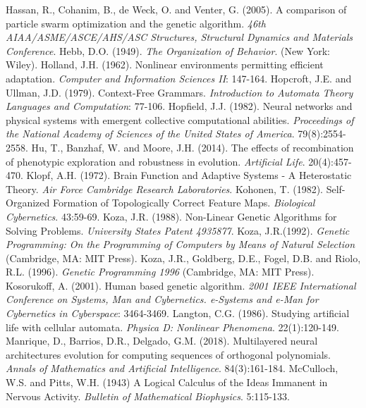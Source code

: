 \documentclass[spanish,a4paper,12pt,twoside]{report}
\begin{document}
\begin{thebibliography}{00}
   Hassan, R., Cohanim, B., de Weck, O. and Venter, G. (2005). A comparison of particle swarm optimization and the genetic algorithm. \emph{46th AIAA/ASME/ASCE/AHS/ASC Structures, Structural Dynamics and Materials Conference}.
   Hebb, D.O. (1949). \emph{The Organization of Behavior}. (New York: Wiley).
   Holland, J.H. (1962). Nonlinear environments permitting efficient adaptation. \emph{Computer and Information Sciences II}: 147-164.
   Hopcroft, J.E. and Ullman, J.D. (1979). Context-Free Grammars. \emph{Introduction to Automata Theory Languages and Computation}: 77-106.
   Hopfield, J.J. (1982). Neural networks and physical systems with emergent collective computational abilities. \emph{Proceedings of the National Academy of Sciences of the United States of America}. 79(8):2554-2558.
   Hu, T., Banzhaf, W. and Moore, J.H. (2014). The effects of recombination of phenotypic exploration and robustness in evolution. \emph{Artificial Life}. 20(4):457-470.
   Klopf, A.H. (1972). Brain Function and Adaptive Systems - A Heterostatic Theory. \emph{Air Force Cambridge Research Laboratories}.
   Kohonen, T. (1982). Self-Organized Formation of Topologically Correct Feature Maps. \emph{Biological Cybernetics}. 43:59-69.
   Koza, J.R. (1988). Non-Linear Genetic Algorithms for Solving Problems. \emph{University States Patent 4935877}.
   Koza, J.R.(1992). \emph{Genetic Programming: On the Programming of Computers by Means of Natural Selection}  (Cambridge, MA: MIT Press).
   Koza, J.R., Goldberg, D.E., Fogel, D.B. and Riolo, R.L. (1996). \emph{Genetic Programming 1996} (Cambridge, MA: MIT Press).
   Kosorukoff, A. (2001). Human based genetic algorithm. \emph{2001 IEEE International Conference on Systems, Man and Cybernetics. e-Systems and e-Man for Cybernetics in Cyberspace}: 3464-3469.
   Langton, C.G. (1986). Studying artificial life with cellular automata. \emph{Physica D: Nonlinear Phenomena}. 22(1):120-149.
   Manrique, D., Barrios, D.R., Delgado, G.M. (2018). Multilayered neural architectures evolution for computing sequences of orthogonal polynomials. \emph{Annals of Mathematics and Artificial Intelligence}. 84(3):161-184.
   McCulloch, W.S. and Pitts, W.H. (1943) A Logical Calculus of the Ideas Immanent in Nervous Activity. \emph{Bulletin of Mathematical Biophysics}. 5:115-133.

\end{thebibliography}
\end{document}
